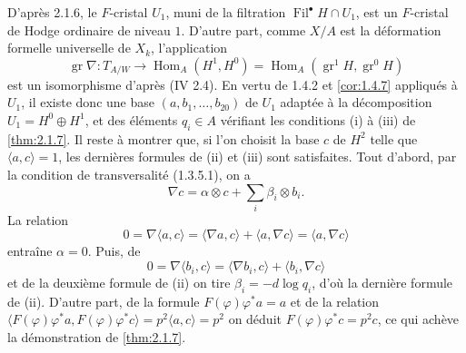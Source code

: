 \documentclass[12pt,a4paper]{article}
\theoremstyle{plain}
\theoremstyle{definition}
\theoremstyle{remark}
\DeclareMathOperator{\Fil}{Fil}
\DeclareMathOperator{\gr}{gr}
\DeclareMathOperator{\Hom}{Hom}
\providecommand{\Hom}{\operatorname{Hom}}
\begin{document}
D'apr\`es 2.1.6, le $F$-cristal $U_1$, muni de la filtration $\Fil^\bullet H \cap U_1$, est un $F$-cristal de Hodge ordinaire de niveau $1$. D'autre part, comme $X/A$ est la d\'eformation formelle universelle de $X_k$, l'application
\[
\gr\nabla : T_{A/W} \longrightarrow \Hom_A(H^1, H^0) = \Hom_A(\gr^1 H, \gr^0 H)
\]
est un isomorphisme d'apr\`es (IV 2.4). En vertu de 1.4.2 et \ref{cor:1.4.7} appliqu\'es \`a $U_1$, il existe donc une base $(a, b_1, \ldots, b_{20})$ de $U_1$ adapt\'ee \`a la d\'ecomposition $U_1 = H^0 \oplus H^1$, et des \'el\'ements $q_i \in A$ v\'erifiant les conditions (i) \`a (iii) de \ref{thm:2.1.7}. Il reste \`a montrer que, si l'on choisit la base $c$ de $H^2$ telle que $\langle a, c \rangle = 1$, les derni\`eres formules de (ii) et (iii) sont satisfaites. Tout d'abord, par la condition de transversalit\'e (1.3.5.1), on a
\[
\nabla c = \alpha \otimes c + \sum_i \beta_i \otimes b_i.
\]
La relation
\[
0 = \nabla\langle a, c \rangle = \langle \nabla a, c \rangle + \langle a, \nabla c \rangle = \langle a, \nabla c \rangle
\]
entra\^ine $\alpha = 0$. Puis, de
\[
0 = \nabla\langle b_i, c \rangle = \langle \nabla b_i, c \rangle + \langle b_i, \nabla c \rangle
\]
et de la deuxi\`eme formule de (ii) on tire $\beta_i = -d\log q_i$, d'o\`u la derni\`ere formule de (ii). D'autre part, de la formule $F(\varphi)\varphi^* a = a$ et de la relation $\langle F(\varphi)\varphi^* a, F(\varphi)\varphi^* c \rangle = p^2\langle a, c \rangle = p^2$ on d\'eduit $F(\varphi)\varphi^* c = p^2 c$, ce qui ach\`eve la d\'emonstration de \ref{thm:2.1.7}.
\end{document}
